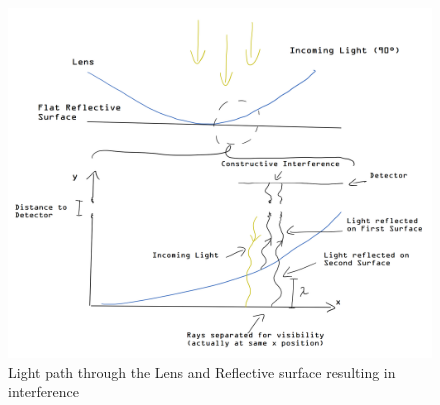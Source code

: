 \documentclass[12pt]{article}
\begin{document}
\begin{figure}[H]
  \centering
  \includegraphics[width=17cm]{./images/theory.png}
  \caption{Light path through the Lens and Reflective surface resulting in interference}
  \label{fig:theory}
\end{figure}
\end{document}
